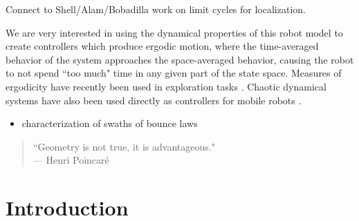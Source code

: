 \documentclass[]{styles/svproc}  %
\begin{document}
Connect to Shell/Alam/Bobadilla work on limit cycles for localization.


We are very interested in using the dynamical properties of this robot model to
create controllers which produce ergodic motion, where the time-averaged
behavior of the system approaches the space-averaged behavior, causing the robot
to not spend ``too much" time in any given part of the state space. Measures
of ergodicity have recently been used in exploration tasks
\cite{miller2016ergodic}. Chaotic dynamical systems have also been used directly
as controllers for mobile robots \cite{nakamura2001chaotic}.

{\color{red} 
\begin{itemize}
\item characterization of swaths of bounce laws
\end{itemize}
}

%
%
%
\iffalse

{\small
\begin{center}
\begin{quotation}
``Geometry is not true, it is advantageous." \\
\hfill    --- Henri Poincar\'e
\end{quotation}
\end{center}
}


\section{Introduction} 
\end{document}
